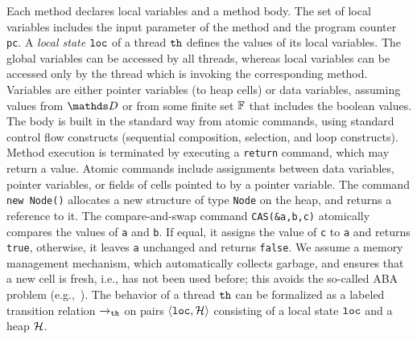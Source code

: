 %
Each method declares local variables and a method body.
%
The set of local variables includes the input parameter of the method and
the program counter {\tt pc}.
A {\it local state} ${\tt loc}$ of a thread ${\tt th}$
defines  the values of its local variables.
The global variables can be
accessed by all threads, whereas local variables can be accessed only
by the thread which is invoking the corresponding method.
Variables are either pointer variables (to heap cells) or data variables, assuming values from $\ddomain$ or from some finite set $\mathbb{F}$ that includes the boolean values.
%
%
%
The body is built in the standard way
from atomic commands, using standard control
flow constructs (sequential composition, selection, and loop constructs).
%
%
%
Method execution is terminated by executing a {\tt return} command,
which may return a value.
%
Atomic commands include assignments between data variables, 
pointer variables, or fields of cells pointed to by a pointer variable.
%
The command {\tt new Node()} allocates a new structure of type
{\tt Node} on the heap, and returns a reference to it.
%
The compare-and-swap command {\tt CAS(\&a,b,c)} atomically
compares the values of {\tt a} and {\tt b}.
If  equal, it assigns the value of
{\tt c} to {\tt a}  and returns {\tt true}, 
otherwise, it leaves {\tt a} unchanged and returns {\tt false}. 
We assume a memory management mechanism, which automatically collects
garbage, and ensures that a new cell is fresh, i.e., has
not been used before; this avoids the so-called
ABA problem (e.g.,~\cite{MS:QueueAlgorithms}).
%
The behavior of a thread ${\tt th}$ can be formalized as 
a labeled transition relation ${\xrightarrow{}{}}_{\!\!{\tt th}}$
on pairs $\left\langle{\tt loc},{\mathcal H}\right\rangle$ consisting of a local state
${\tt loc}$ and a heap ${\mathcal H}$.

